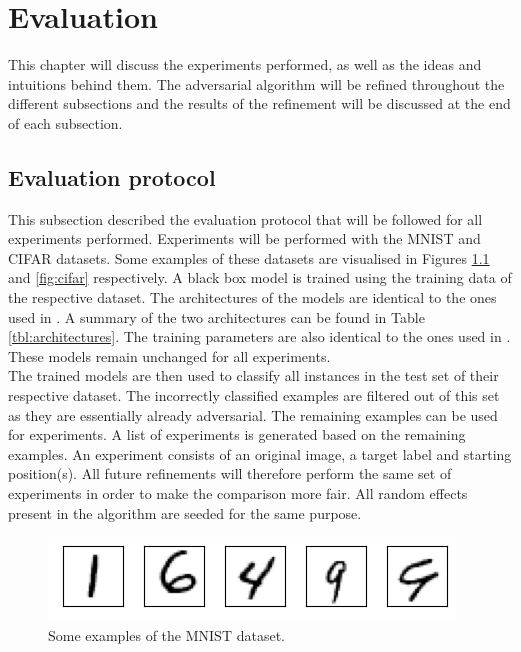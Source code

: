 \chapter{Evaluation}
This chapter will discuss the experiments performed, as well as the ideas and intuitions behind them. The adversarial algorithm will be refined throughout the different subsections and the results of the refinement will be discussed at the end of each subsection.

\section{Evaluation protocol}
This subsection described the evaluation protocol that will be followed for all experiments performed. Experiments will be performed with the MNIST \cite{mnist} and CIFAR \cite{cifar} datasets. Some examples of these datasets are visualised in Figures \ref{fig:mnist} and \ref{fig:cifar} respectively. A black box model is trained using the training data of the respective dataset. The architectures of the models are identical to the ones used in \cite{cw_attack, defensive_distillation}. A summary of the two architectures can be found in Table \ref{tbl:architectures}. The training parameters are also identical to the ones used in \cite{cw_attack, defensive_distillation}. These models remain unchanged for all experiments.\\

The trained models are then used to classify all instances in the test set of their respective dataset. The incorrectly classified examples are filtered out of this set as they are essentially already adversarial. The remaining examples can be used for experiments. A list of experiments is generated based on the remaining examples. An experiment consists of an original image, a target label and starting position(s). All future refinements will therefore perform the same set of experiments in order to make the comparison more fair. All random effects present in the algorithm are seeded for the same purpose.\\

\begin{figure}
\centering
\includegraphics[width=\textwidth]{Images/mnist.png}
\caption[Some examples of the MNIST dataset]{Some examples of the MNIST dataset.}
\label{fig:mnist}
\end{figure}

